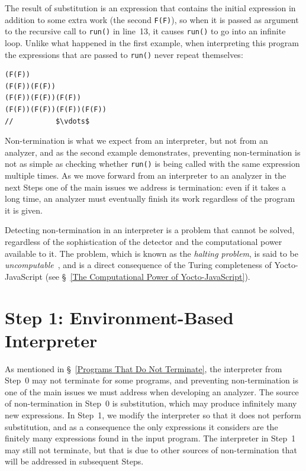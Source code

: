 \documentclass[12pt, oneside]{book}
\begin{document}
The result of substitution is an expression that contains the initial expression in addition to some extra work (the second \texttt{F(F)}), so when it is passed as argument to the recursive call to \texttt{run()} in line~13, it causes \texttt{run()} to go into an infinite loop. Unlike what happened in the first example, when interpreting this program the expressions that are passed to \texttt{run()} never repeat themselves:

\begin{verbatim}
(F(F))
(F(F))(F(F))
(F(F))(F(F))(F(F))
(F(F))(F(F))(F(F))(F(F))
//          $\vdots$
\end{verbatim}

Non-termination is what we expect from an interpreter, but not from an analyzer, and as the second example demonstrates, preventing non-termination is not as simple as checking whether \texttt{run()} is being called with the same expression multiple times. As we move forward from an interpreter to an analyzer in the next Steps one of the main issues we address is termination: even if it takes a long time, an analyzer must eventually finish its work regardless of the program it is given.

\begin{mdframed}[frametitle = {Advanced}]
Detecting non-termination in an interpreter is a problem that cannot be solved, regardless of the sophistication of the detector and the computational power available to it. The problem, which is known as the \emph{halting problem}, is said to be \emph{uncomputable}~\cite[§~8]{understanding-computation}, and is a direct consequence of the Turing completeness of Yocto-JavaScript (see §~\ref{The Computational Power of Yocto-JavaScript}).
\end{mdframed}

\section{Step 1: Environment-Based Interpreter}

As mentioned in §~\ref{Programs That Do Not Terminate}, the interpreter from Step~0 may not terminate for some programs, and preventing non-termination is one of the main issues we must address when developing an analyzer. The source of non-termination in Step~0 is substitution, which may produce infinitely many new expressions. In Step~1, we modify the interpreter so that it does not perform substitution, and as a consequence the only expressions it considers are the finitely many expressions found in the input program. The interpreter in Step~1 may still not terminate, but that is due to other sources of non-termination that will be addressed in subsequent Steps.
\end{document}
